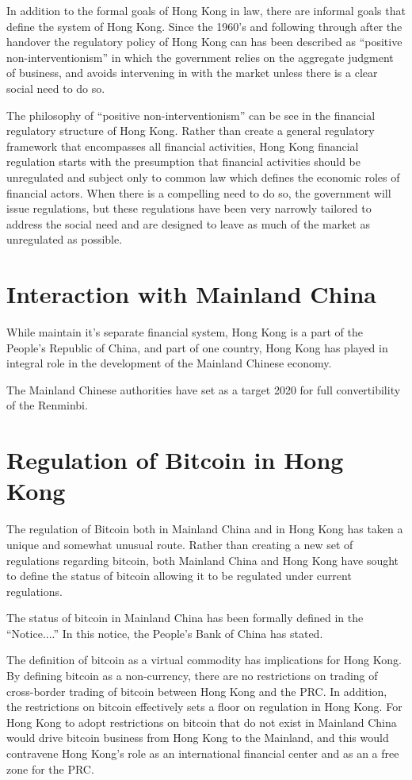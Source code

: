 In addition to the formal goals of Hong Kong in law, there are
informal goals that define the system of Hong Kong.  Since the 1960's
and following through after the handover the regulatory policy of Hong
Kong can has been described as ``positive non-interventionism'' in
which the government relies on the aggregate judgment of business, and
avoids intervening in with the market unless there is a clear social
need to do so.

The philosophy of ``positive non-interventionism'' can be see in the
financial regulatory structure of Hong Kong.  Rather than create a
general regulatory framework that encompasses all financial
activities, Hong Kong financial regulation starts with the presumption
that financial activities should be unregulated and subject only to
common law which defines the economic roles of financial actors.  When
there is a compelling need to do so, the government will issue
regulations, but these regulations have been very narrowly tailored to
address the social need and are designed to leave as much of the
market as unregulated as possible.

\section{Interaction with Mainland China}
While maintain it's separate financial system, Hong Kong is a part of
the People's Republic of China, and part of one country, Hong Kong has
played in integral role in the development of the Mainland Chinese
economy.

The Mainland Chinese authorities have set as a target 2020 for full
convertibility of the Renminbi.

\section{Regulation of Bitcoin in Hong Kong}

The regulation of Bitcoin both in Mainland China and in Hong Kong has
taken a unique and somewhat unusual route.  Rather than creating a new
set of regulations regarding bitcoin, both Mainland China and Hong
Kong have sought to define the status of bitcoin allowing it to be
regulated under current regulations.

The status of bitcoin in Mainland China has been formally defined in
the ``Notice....''  In this notice, the People's Bank of China has
stated.  

The definition of bitcoin as a virtual commodity has implications for
Hong Kong.  By defining bitcoin as a non-currency, there are no
restrictions on trading of cross-border trading of bitcoin between
Hong Kong and the PRC.  In addition, the restrictions on bitcoin
effectively sets a floor on regulation in Hong Kong.  For Hong Kong to
adopt restrictions on bitcoin that do not exist in Mainland China
would drive bitcoin business from Hong Kong to the Mainland, and this
would contravene Hong Kong's role as an international financial center
and as an a free zone for the PRC.

